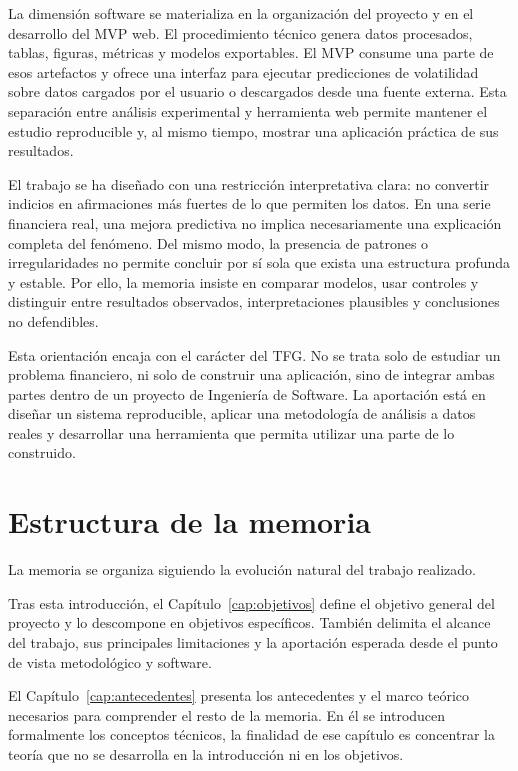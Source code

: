 La dimensión software se materializa en la organización del proyecto y en el desarrollo del MVP web. El procedimiento técnico genera datos procesados, tablas, figuras, métricas y modelos exportables. El MVP consume una parte de esos artefactos y ofrece una interfaz para ejecutar predicciones de volatilidad sobre datos cargados por el usuario o descargados desde una fuente externa. Esta separación entre análisis experimental y herramienta web permite mantener el estudio reproducible y, al mismo tiempo, mostrar una aplicación práctica de sus resultados.

El trabajo se ha diseñado con una restricción interpretativa clara: no convertir indicios en afirmaciones más fuertes de lo que permiten los datos. En una serie financiera real, una mejora predictiva no implica necesariamente una explicación completa del fenómeno. Del mismo modo, la presencia de patrones o irregularidades no permite concluir por sí sola que exista una estructura profunda y estable. Por ello, la memoria insiste en comparar modelos, usar controles y distinguir entre resultados observados, interpretaciones plausibles y conclusiones no defendibles.

Esta orientación encaja con el carácter del TFG. No se trata solo de estudiar un problema financiero, ni solo de construir una aplicación, sino de integrar ambas partes dentro de un proyecto de Ingeniería de Software. La aportación está en diseñar un sistema reproducible, aplicar una metodología de análisis a datos reales y desarrollar una herramienta que permita utilizar una parte de lo construido.

\section{Estructura de la memoria}\label{sec:estructura-memoria}

La memoria se organiza siguiendo la evolución natural del trabajo realizado.

Tras esta introducción, el Capítulo~\ref{cap:objetivos} define el objetivo general del proyecto y lo descompone en objetivos específicos. También delimita el alcance del trabajo, sus principales limitaciones y la aportación esperada desde el punto de vista metodológico y software.

El Capítulo~\ref{cap:antecedentes} presenta los antecedentes y el marco teórico necesarios para comprender el resto de la memoria. En él se introducen formalmente los conceptos técnicos, la finalidad de ese capítulo es concentrar la teoría que no se desarrolla en la introducción ni en los objetivos.

